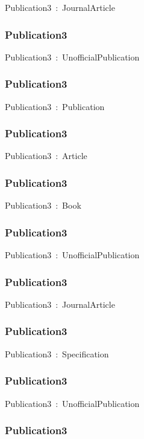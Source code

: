 \documentclass{article}
\begin{document}
Publication3~:~JournalArticle

\subsubsection*{Publication3}

Publication3~:~UnofficialPublication

\subsubsection*{Publication3}

Publication3~:~Publication

\subsubsection*{Publication3}

Publication3~:~Article

\subsubsection*{Publication3}

Publication3~:~Book

\subsubsection*{Publication3}

Publication3~:~UnofficialPublication

\subsubsection*{Publication3}

Publication3~:~JournalArticle

\subsubsection*{Publication3}

Publication3~:~Specification

\subsubsection*{Publication3}

Publication3~:~UnofficialPublication

\subsubsection*{Publication3}
\end{document}

